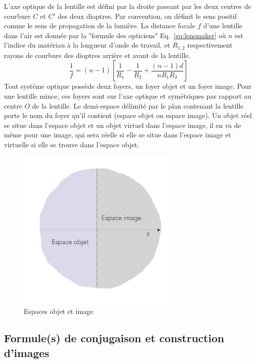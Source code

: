 \documentclass[a4paper]{book}
\begin{document}
L'axe optique de la lentille est défini par la droite passant par les deux centres de courbure $C$ et $C'$ des deux dioptres. Par convention, on définit le sens positif comme le sens de propagation de la lumière.  La distance focale $f$ d'une lentille dans l'air est donnée par la "formule des opticiens" Eq.~\ref{eq:lensmaker} où $n$ est l'indice du matériau à la longueur d'onde de travail, et $R_{1, 2}$ respectivement rayons de courbure des dioptres arrière et avant de la lentille. 
\begin{equation}
\label{eq:lensmaker}
\frac{1}{f}=(n-1)\left[\frac{1}{R_1}-\frac{1}{R_2}+\frac{(n-1)d}{n R_1 R_2}\right]
\end{equation}
Tout système optique possède deux foyers, un foyer objet et un foyer image. Pour une lentille mince, ces foyers sont sur l'axe optique et symétriques par rapport au centre $O$ de la lentille. Le demi-espace délimité par le plan contenant la lentille porte le nom du foyer qu'il contient (espace objet ou espace image). Un objet réel se situe dans l'espace objet et un objet virtuel dans l'espace image, il en va de même pour une image, qui sera réelle si elle se situe dans l'espace image et virtuelle si elle se trouve dans l'espace objet.
\begin{figure}[!htbp]
\begin{center}
\includegraphics[width=8cm]{espaces.png}
\end{center}
\caption{Espaces objet et image}
\label{fig:espaces_lentille_mince}
\end{figure}

\subsection{Formule(s) de conjugaison et construction d'images}
\end{document}
